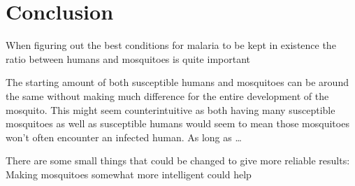 \documentclass[a4paper]{report}
\begin{document}
\section{Conclusion}
When figuring out the best conditions for malaria to be kept in existence the
ratio between humans and mosquitoes is quite important

The starting amount of both susceptible humans and mosquitoes can be around the
same without making much difference for the entire development of the mosquito.
This might seem counterintuitive as both having many susceptible mosquitoes as
well as susceptible humans would seem to mean those mosquitoes won't often
encounter an infected human. As long as \dots

There are some small things that could be changed to give more reliable results:
Making mosquitoes somewhat more intelligent could help

\end{document}
